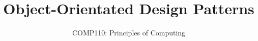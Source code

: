 \usepackage{../../beamerthemeFalmouthGamesAcademy}
\usepackage{multimedia}
\graphicspath{ {../../} }


\usepackage[normalem]{ulem}
\usepackage{wasysym}

\usepackage{pdfpages}

\usepackage{tikz}
\usetikzlibrary{positioning,shapes,shadows,arrows,automata}


\title{Object-Orientated Design Patterns}
\subtitle{COMP110: Principles of Computing}

\frame{\titlepage} 

